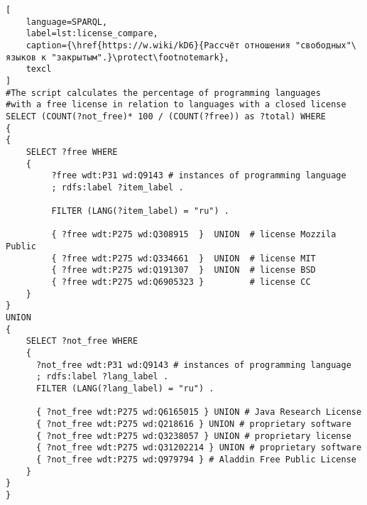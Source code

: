 \label{question:prog_lang_2}
\begin{lstlisting}[
	language=SPARQL,
	label=lst:license_compare,
	caption={\href{https://w.wiki/kD6}{Рассчёт отношения "свободных"\ языков к "закрытым".}\protect\footnotemark},
	texcl
]
#The script calculates the percentage of programming languages 
#with a free license in relation to languages with a closed license
SELECT (COUNT(?not_free)* 100 / (COUNT(?free)) as ?total) WHERE
{ 
{
    SELECT ?free WHERE 
    {
         ?free wdt:P31 wd:Q9143 # instances of programming language
         ; rdfs:label ?item_label . 

         FILTER (LANG(?item_label) = "ru") . 
  
         { ?free wdt:P275 wd:Q308915  }  UNION  # license Mozzila Public
         { ?free wdt:P275 wd:Q334661  }  UNION  # license MIT
         { ?free wdt:P275 wd:Q191307  }  UNION  # license BSD
         { ?free wdt:P275 wd:Q6905323 }         # license CC
    }
}
UNION
{
    SELECT ?not_free WHERE 
    {
      ?not_free wdt:P31 wd:Q9143 # instances of programming language
      ; rdfs:label ?lang_label . 
      FILTER (LANG(?lang_label) = "ru") .
  
      { ?not_free wdt:P275 wd:Q6165015 } UNION # Java Research License
      { ?not_free wdt:P275 wd:Q218616 } UNION # proprietary software
      { ?not_free wdt:P275 wd:Q3238057 } UNION # proprietary license 
      { ?not_free wdt:P275 wd:Q31202214 } UNION # proprietary software 
      { ?not_free wdt:P275 wd:Q979794 } # Aladdin Free Public License
    }
}
}
\end{lstlisting}

